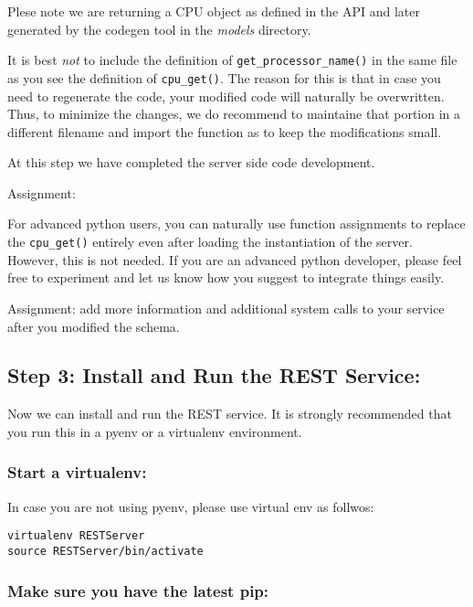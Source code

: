 Plese note we are returning a CPU object as defined in the API and later
generated by the codegen tool in the \emph{models} directory.

It is best \emph{not} to include the definition of
\texttt{get\_processor\_name()} in the same file as you see the
definition of \texttt{cpu\_get()}. The reason for this is that in case
you need to regenerate the code, your modified code will naturally be
overwritten. Thus, to minimize the changes, we do recommend to maintaine
that portion in a different filename and import the function as to keep
the modifications small.

At this step we have completed the server side code development.

Assignment:

For advanced python users, you can naturally use function assignments to
replace the \texttt{cpu\_get()} entirely even after loading the
instantiation of the server. However, this is not needed. If you are an
advanced python developer, please feel free to experiment and let us
know how you suggest to integrate things easily.

Assignment: add more information and additional system calls to your
service after you modified the schema.

\hypertarget{step-3-install-and-run-the-rest-service}{%
\subsection{Step 3: Install and Run the REST
Service:}\label{step-3-install-and-run-the-rest-service}}

Now we can install and run the REST service. It is strongly recommended
that you run this in a pyenv or a virtualenv environment.

\hypertarget{start-a-virtualenv}{%
\subsubsection{Start a virtualenv:}\label{start-a-virtualenv}}

In case you are not using pyenv, please use virtual env as follwos:

\begin{verbatim}
virtualenv RESTServer
source RESTServer/bin/activate
\end{verbatim}

\hypertarget{make-sure-you-have-the-latest-pip}{%
\subsubsection{Make sure you have the latest
pip:}\label{make-sure-you-have-the-latest-pip}}

